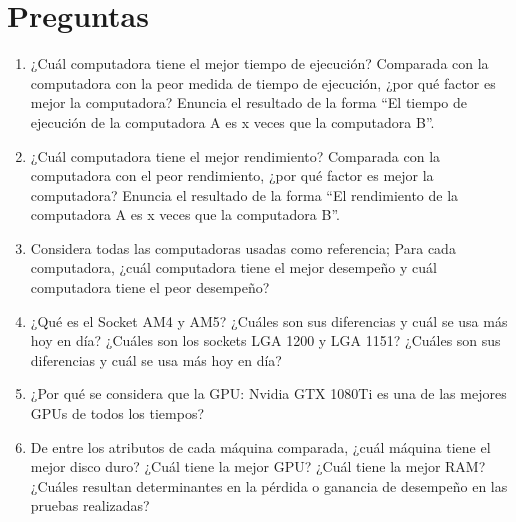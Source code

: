 \documentclass[12pt]{article}
\begin{document}
\section{Preguntas}
\begin{enumerate}[(4.1)]
    \item ¿Cuál computadora tiene el mejor tiempo de ejecución? Comparada con la computadora con la peor medida de tiempo de ejecución, ¿por qué factor es mejor la computadora? Enuncia el resultado de la forma “El tiempo de ejecución de la computadora A es x veces que la computadora B”.
    
    \item ¿Cuál computadora tiene el mejor rendimiento? Comparada con la computadora con el peor rendimiento, ¿por qué factor es mejor la computadora? Enuncia el resultado de la forma “El rendimiento de la computadora A es x veces que la computadora B”.

    \item Considera todas las computadoras usadas como referencia; Para cada computadora, ¿cuál computadora tiene el mejor desempeño y cuál computadora tiene el peor desempeño?

    \item ¿Qué es el Socket AM4 y AM5? ¿Cuáles son sus diferencias y cuál se usa más hoy en día? ¿Cuáles son los sockets LGA 1200 y LGA 1151? ¿Cuáles son sus diferencias y cuál se usa más hoy en día?

    \item ¿Por qué se considera que la GPU: Nvidia GTX 1080Ti es una de las mejores GPUs de todos los tiempos?

    \item De entre los atributos de cada máquina comparada, ¿cuál máquina tiene el mejor disco duro? ¿Cuál tiene la mejor GPU? ¿Cuál tiene la mejor RAM? ¿Cuáles resultan determinantes en la pérdida o ganancia de desempeño en las pruebas realizadas?
\end{enumerate}
\end{document}
